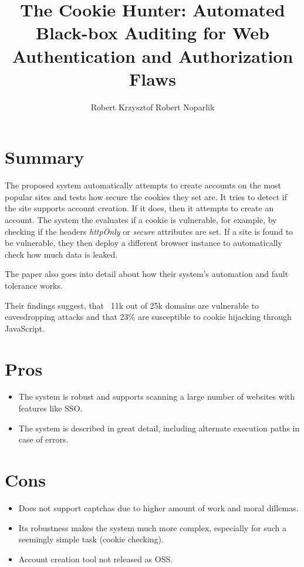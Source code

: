 \documentclass{article}
\title{The Cookie Hunter: Automated Black-box Auditing for Web
Authentication and Authorization Flaws}
\author{Robert Krzysztof Robert Noparlik}
\begin{document}
\maketitle


\section{Summary}

The proposed system automatically attempts to create accounts on the most popular sites and tests how secure the cookies they set are. It tries to detect if the site supports account creation. If it does, then it attempts to create an account. The system the evaluates if a cookie is vulnerable, for example, by checking if the headers \textit{httpOnly} or \textit{secure} attributes are set. If a site is found to be vulnerable, they then deploy a different browser instance to automatically check how much data is leaked.

The paper also goes into detail about how their system's automation and fault tolerance works.

Their findings suggest, that ~11k out of 25k domains are vulnerable to eavesdropping attacks and that 23\% are susceptible to cookie hijacking through JavaScript.

\section{Pros}

\begin{itemize}
	\item The system is robust and supports scanning a large number of websites with features like SSO.
	\item The system is described in great detail, including alternate execution paths in case of errors.
\end{itemize}


\section{Cons}

\begin{itemize}
	\item Does not support captchas due to higher amount of work and moral dillemas.
	\item Its robustness makes the system much more complex, especially for such a seemingly simple task (cookie checking).
	\item Account creation tool not released as OSS.
\end{itemize}
\end{document}
